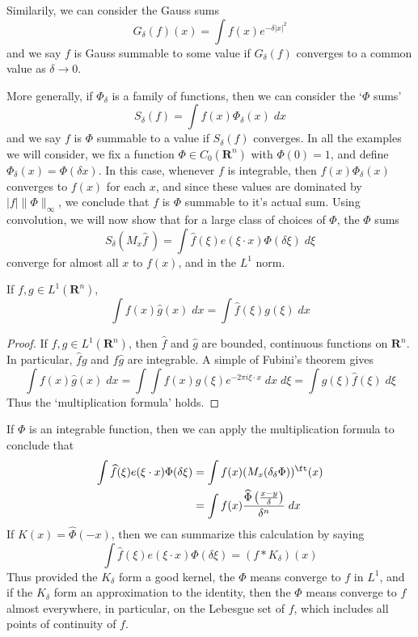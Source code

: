 \begin{example}
	Similarily, we can consider the Gauss sums
	\[ G_\delta(f)(x) = \int f(x) e^{-\delta |x|^2} \]
	and we say $f$ is Gauss summable to some value if $G_\delta(f)$ converges to a common value as $\delta \to 0$.
\end{example}

More generally, if $\Phi_\delta$ is a family of functions, then we can consider the `$\Phi$ sums'
%
\[ S_\delta(f) = \int f(x) \Phi_\delta(x)\; dx \]
%
and we say $f$ is $\Phi$ summable to a value if $S_\delta(f)$ converges. In all the examples we will consider, we fix a function $\Phi \in C_0(\mathbf{R}^n)$ with $\Phi(0) = 1$, and define $\Phi_\delta(x) = \Phi(\delta x)$. In this case, whenever $f$ is integrable, then $f(x) \Phi_\delta(x)$ converges to $f(x)$ for each $x$, and since these values are dominated by $|f| \| \Phi \|_\infty$, we conclude that $f$ is $\Phi$ summable to it's actual sum. Using convolution, we will now show that for a large class of choices of $\Phi$, the $\Phi$ sums
%
\[ S_\delta \left( M_x \widehat{f}\ \right) = \int \widehat{f}(\xi) e(\xi \cdot x) \Phi(\delta \xi)\; d\xi \]
%
converge for almost all $x$ to $f(x)$, and in the $L^1$ norm.

\begin{theorem}
	If $f,g \in L^1(\mathbf{R}^n)$,
	\[ \int f(x) \widehat{g}(x)\; dx = \int \widehat{f}(\xi) g(\xi)\; dx \]
\end{theorem}
\begin{proof}
	If $f, g \in L^1(\mathbf{R}^n)$, then $\widehat{f}$ and $\widehat{g}$ are bounded, continuous functions on $\mathbf{R}^n$. In particular, $\widehat{f} g$ and $f \widehat{g}$ are integrable. A simple of Fubini's theorem gives
	\[ \int f(x) \widehat{g}(x)\; dx = \int \int f(x) g(\xi) e^{- 2 \pi i \xi \cdot x}\; dx\; d\xi = \int g(\xi) \widehat{f}(\xi)\; d\xi \]
	Thus the `multiplication formula' holds. 
\end{proof}

If $\Phi$ is an integrable function, then we can apply the multiplication formula to conclude that
%
\begin{align*}
	\int \widehat{f}(\xi) e(\xi \cdot x) \Phi(\delta \xi) &= \int f(x) (M_x (\delta_\delta \Phi))^\ft(x)\\
	&= \int f(x) \frac{\widehat{\Phi} \left( \frac{x - y}{\delta} \right) }{\delta^n}\; dx
\end{align*}
%
If $K(x) = \widehat{\Phi}(-x)$, then we can summarize this calculation by saying
%
\[ \int \widehat{f}(\xi) e(\xi \cdot x) \Phi(\delta \xi) = (f * K_\delta)(x) \]
%
Thus provided the $K_\delta$ form a good kernel, the $\Phi$ means converge to $f$ in $L^1$, and if the $K_\delta$ form an approximation to the identity, then the $\Phi$ means converge to $f$ almost everywhere, in particular, on the Lebesgue set of $f$, which includes all points of continuity of $f$.

